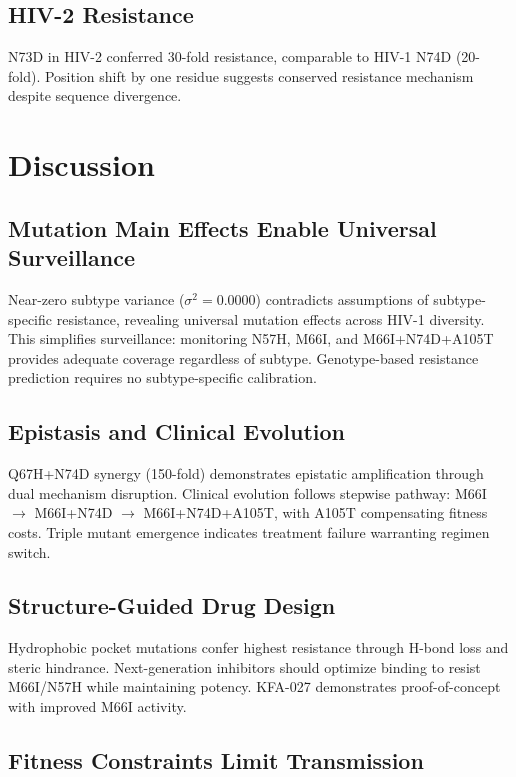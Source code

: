\documentclass[11pt]{article}
\begin{document}
\subsection{HIV-2 Resistance}

N73D in HIV-2 conferred 30-fold resistance, comparable to HIV-1 N74D (20-fold). Position shift by one residue suggests conserved resistance mechanism despite sequence divergence.

\section{Discussion}

\subsection{Mutation Main Effects Enable Universal Surveillance}

Near-zero subtype variance ($\sigma^2=0.0000$) contradicts assumptions of subtype-specific resistance, revealing universal mutation effects across HIV-1 diversity. This simplifies surveillance: monitoring N57H, M66I, and M66I+N74D+A105T provides adequate coverage regardless of subtype. Genotype-based resistance prediction requires no subtype-specific calibration.

\subsection{Epistasis and Clinical Evolution}

Q67H+N74D synergy (150-fold) demonstrates epistatic amplification through dual mechanism disruption. Clinical evolution follows stepwise pathway: M66I $\rightarrow$ M66I+N74D $\rightarrow$ M66I+N74D+A105T, with A105T compensating fitness costs. Triple mutant emergence indicates treatment failure warranting regimen switch.

\subsection{Structure-Guided Drug Design}

Hydrophobic pocket mutations confer highest resistance through H-bond loss and steric hindrance. Next-generation inhibitors should optimize binding to resist M66I/N57H while maintaining potency. KFA-027 demonstrates proof-of-concept with improved M66I activity.

\subsection{Fitness Constraints Limit Transmission}
\end{document}
